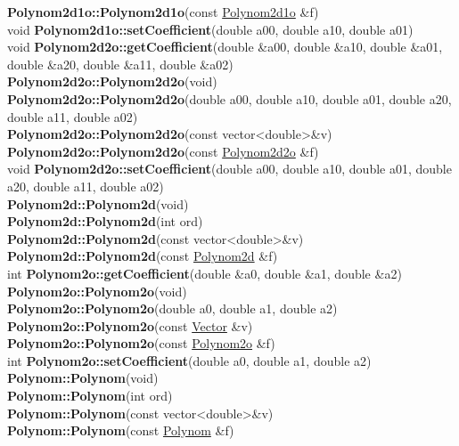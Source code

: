 \documentclass[10pt,titlepage]{article}
\def\functionlistentry#1#2#3#4#5#6{\noindent #1 {\bf #2}(#3) \dotfill #6\\}
\begin{document}
{{\functionlistentry{}{Polynom2d1o::Polynom2d1o}{const \hyperlink{Polynom2d1o}{Polynom2d1o} \&f}{1041}{functions}{}
\functionlistentry{void}{Polynom2d1o::setCoefficient}{double a00, double a10, double a01}{1042}{functions}{}
\functionlistentry{void}{Polynom2d2o::getCoefficient}{double \&a00, double \&a10, double \&a01, double \&a20, double \&a11, double \&a02}{1049}{functions}{}
\functionlistentry{}{Polynom2d2o::Polynom2d2o}{void}{1044}{functions}{}
\functionlistentry{}{Polynom2d2o::Polynom2d2o}{double a00, double a10, double a01, double a20, double a11, double a02}{1045}{functions}{}
\functionlistentry{}{Polynom2d2o::Polynom2d2o}{const vector\textless {}double\textgreater  \&v}{1046}{functions}{}
\functionlistentry{}{Polynom2d2o::Polynom2d2o}{const \hyperlink{Polynom2d2o}{Polynom2d2o} \&f}{1047}{functions}{}
\functionlistentry{void}{Polynom2d2o::setCoefficient}{double a00, double a10, double a01, double a20, double a11, double a02}{1048}{functions}{}
\functionlistentry{}{Polynom2d::Polynom2d}{void}{1050}{functions}{}
\functionlistentry{}{Polynom2d::Polynom2d}{int ord}{1051}{functions}{}
\functionlistentry{}{Polynom2d::Polynom2d}{const vector\textless {}double\textgreater  \&v}{1052}{functions}{}
\functionlistentry{}{Polynom2d::Polynom2d}{const \hyperlink{Polynom2d}{Polynom2d} \&f}{1053}{functions}{}
\functionlistentry{int}{Polynom2o::getCoefficient}{double \&a0, double \&a1, double \&a2}{1014}{functions}{}
\functionlistentry{}{Polynom2o::Polynom2o}{void}{1009}{functions}{}
\functionlistentry{}{Polynom2o::Polynom2o}{double a0, double a1, double a2}{1010}{functions}{}
\functionlistentry{}{Polynom2o::Polynom2o}{const \hyperlink{Vector}{Vector} \&v}{1011}{functions}{}
\functionlistentry{}{Polynom2o::Polynom2o}{const \hyperlink{Polynom2o}{Polynom2o} \&f}{1012}{functions}{}
\functionlistentry{int}{Polynom2o::setCoefficient}{double a0, double a1, double a2}{1013}{functions}{}
\functionlistentry{}{Polynom::Polynom}{void}{1015}{functions}{}
\functionlistentry{}{Polynom::Polynom}{int ord}{1016}{functions}{}
\functionlistentry{}{Polynom::Polynom}{const vector\textless {}double\textgreater  \&v}{1017}{functions}{}
\functionlistentry{}{Polynom::Polynom}{const \hyperlink{Polynom}{Polynom} \&f}{1018}{functions}{}

}}
\end{document}
